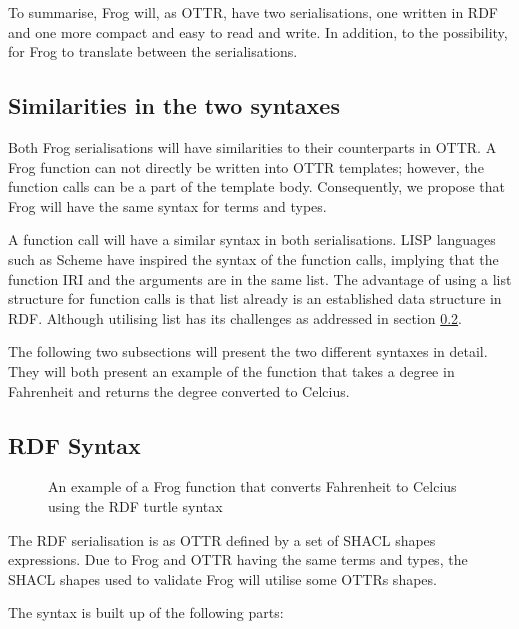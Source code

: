\para
To summarise, Frog will, as OTTR, have two serialisations, one written in RDF and one more compact and easy to read and write. In addition, to the possibility, for Frog to translate between the serialisations.

\subsection{Similarities in the two syntaxes}
Both Frog serialisations will have similarities to their counterparts in OTTR. A Frog function can not directly be written into OTTR templates; however, the function calls can be a part of the template body. Consequently, we propose that Frog will have the same syntax for terms and types. 

\para 
A function call will have a similar syntax in both serialisations. LISP languages such as Scheme have inspired the syntax of the function calls, implying that the function IRI and the arguments are in the same list. The advantage of using a list structure for function calls is that list already is an established data structure in RDF. Although utilising list has its challenges as addressed in section \ref*{RDF_syntax}.

\para 
The following two subsections will present the two different syntaxes in detail. They will both present an example of the function that takes a degree in Fahrenheit and returns the degree converted to Celcius. 

\subsection{RDF Syntax}
\label{RDF_syntax}

\begin{figure}[b]
    
    \caption{An example of a Frog function that converts Fahrenheit to Celcius using the RDF turtle syntax}
    \label{fig:rdf_example}
\end{figure}

\para
The RDF serialisation is as OTTR defined by a set of SHACL shapes expressions. Due to Frog and OTTR having the same terms and types, the SHACL shapes used to validate Frog will utilise some OTTRs shapes. 

\para
The syntax is built up of the following parts: 

